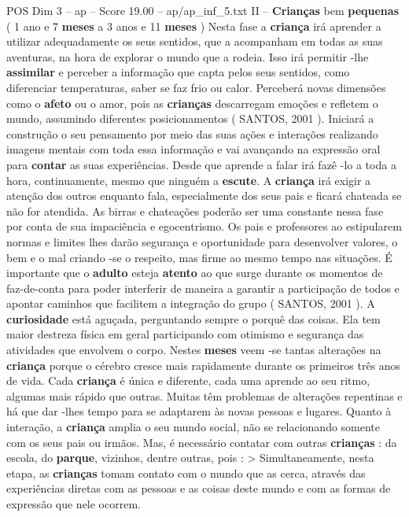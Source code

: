 \begin{textsample}{POS Dim 3 – ap – Score 19.00 – ap/ap\_inf\_5.txt}  \label{ex:f3_pos_184}
II – \textbf{Crianças} bem \textbf{pequenas} ( 1 ano e 7 \textbf{meses} a 3 anos e 11 \textbf{meses} ) Nesta fase a \textbf{criança} irá aprender a utilizar adequadamente os seus sentidos, que a acompanham em todas as suas aventuras, na hora de explorar o mundo que a rodeia.
Isso irá permitir -lhe \textbf{assimilar} e perceber a informação que capta pelos seus sentidos, como diferenciar temperaturas, saber se faz frio ou calor.
Perceberá novas dimensões como o \textbf{afeto} ou o amor, pois as \textbf{crianças} descarregam emoções e refletem o mundo, assumindo diferentes posicionamentos ( SANTOS, 2001 ).
Iniciará a construção o seu pensamento por meio das suas ações e interações realizando imagens mentais com toda essa informação e vai avançando na expressão oral para \textbf{contar} as suas experiências.
Desde que aprende a falar irá fazê -lo a toda a hora, continuamente, mesmo que ninguém a \textbf{escute}.
A \textbf{criança} irá exigir a atenção dos outros enquanto fala, especialmente dos seus pais e ficará chateada se não for atendida.
As birras e chateações poderão ser uma constante nessa fase por conta de sua impaciência e egocentrismo.
Os pais e professores ao estipularem normas e limites lhes darão segurança e oportunidade para desenvolver valores, o bem e o mal criando -se o respeito, mas firme ao mesmo tempo nas situações.
É importante que o \textbf{adulto} esteja \textbf{atento} ao que surge durante os momentos de faz-de-conta para poder interferir de maneira a garantir a participação de todos e apontar caminhos que facilitem a integração do grupo ( SANTOS, 2001 ).
A \textbf{curiosidade} está aguçada, perguntando sempre o porquê das coisas.
Ela tem maior destreza física em geral participando com otimismo e segurança das atividades que envolvem o corpo.
Nestes \textbf{meses} veem -se tantas alterações na \textbf{criança} porque o cérebro cresce mais rapidamente durante os primeiros três anos de vida.
Cada \textbf{criança} é única e diferente, cada uma aprende ao seu ritmo, algumas mais rápido que outras.
Muitas têm problemas de alterações repentinas e há que dar -lhes tempo para se adaptarem às novas pessoas e lugares.
Quanto à interação, a \textbf{criança} amplia o seu mundo social, não se relacionando somente com os seus pais ou irmãos.
Mas, é necessário contatar com outras \textbf{crianças} : da escola, do \textbf{parque}, vizinhos, dentre outras, pois : > Simultaneamente, nesta etapa, as \textbf{crianças} tomam contato com o mundo que as cerca, através das experiências diretas com as pessoas e as coisas deste mundo e com as formas de expressão que nele ocorrem.

\end{textsample}
